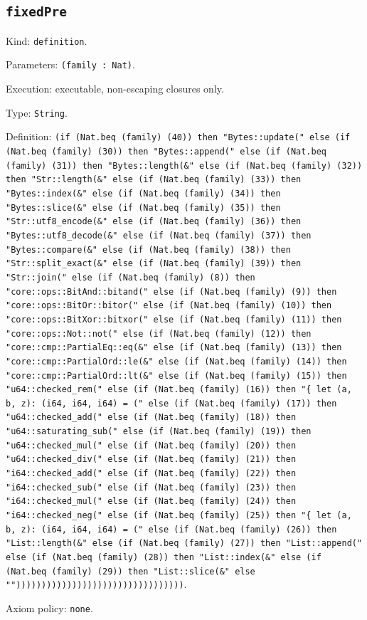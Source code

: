 \documentclass[11pt]{article}
\begin{document}
\subsection*{\texttt{fixedPre}}
\noindent Kind: \texttt{definition}.\par
\noindent Parameters: \texttt{(family : Nat)}.\par
\noindent Execution: executable, non-escaping closures only.\par
\noindent Type: \texttt{String}.\par
\noindent Definition: \texttt{(if (Nat.beq (family) (40)) then "Bytes::update(" else (if (Nat.beq (family) (30)) then "Bytes::append(" else (if (Nat.beq (family) (31)) then "Bytes::length(\&" else (if (Nat.beq (family) (32)) then "Str::length(\&" else (if (Nat.beq (family) (33)) then "Bytes::index(\&" else (if (Nat.beq (family) (34)) then "Bytes::slice(\&" else (if (Nat.beq (family) (35)) then "Str::utf8\_encode(\&" else (if (Nat.beq (family) (36)) then "Bytes::utf8\_decode(\&" else (if (Nat.beq (family) (37)) then "Bytes::compare(\&" else (if (Nat.beq (family) (38)) then "Str::split\_exact(\&" else (if (Nat.beq (family) (39)) then "Str::join(" else (if (Nat.beq (family) (8)) then "core::ops::BitAnd::bitand(" else (if (Nat.beq (family) (9)) then "core::ops::BitOr::bitor(" else (if (Nat.beq (family) (10)) then "core::ops::BitXor::bitxor(" else (if (Nat.beq (family) (11)) then "core::ops::Not::not(" else (if (Nat.beq (family) (12)) then "core::cmp::PartialEq::eq(\&" else (if (Nat.beq (family) (13)) then "core::cmp::PartialOrd::le(\&" else (if (Nat.beq (family) (14)) then "core::cmp::PartialOrd::lt(\&" else (if (Nat.beq (family) (15)) then "u64::checked\_rem(" else (if (Nat.beq (family) (16)) then "\{ let (a, b, z): (i64, i64, i64) = (" else (if (Nat.beq (family) (17)) then "u64::checked\_add(" else (if (Nat.beq (family) (18)) then "u64::saturating\_sub(" else (if (Nat.beq (family) (19)) then "u64::checked\_mul(" else (if (Nat.beq (family) (20)) then "u64::checked\_div(" else (if (Nat.beq (family) (21)) then "i64::checked\_add(" else (if (Nat.beq (family) (22)) then "i64::checked\_sub(" else (if (Nat.beq (family) (23)) then "i64::checked\_mul(" else (if (Nat.beq (family) (24)) then "i64::checked\_neg(" else (if (Nat.beq (family) (25)) then "\{ let (a, b, z): (i64, i64, i64) = (" else (if (Nat.beq (family) (26)) then "List::length(\&" else (if (Nat.beq (family) (27)) then "List::append(" else (if (Nat.beq (family) (28)) then "List::index(\&" else (if (Nat.beq (family) (29)) then "List::slice(\&" else "")))))))))))))))))))))))))))))))))}.\par
\noindent Axiom policy: \texttt{none}.\par
\end{document}
